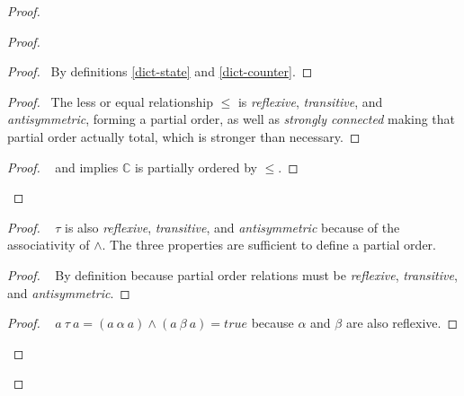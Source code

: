 \documentclass[10pt, oneside]{article}   	%
\begin{document}
\begin{proof}
\begin{proof}
			\begin{proof}
				\pf~By definitions \ref{dict-state} and \ref{dict-counter}.
			\end{proof}
			
			\begin{proof}
				\pf~The less or equal relationship $\leq$ is \textit{reflexive}, \textit{transitive}, and \textit{antisymmetric}, forming a partial order, as well as \textit{strongly connected} making that partial order actually total, which is stronger than necessary.
			\end{proof}

			\qedstep
			\begin{proof}
				\pf~ and  implies $\mathds{C}$ is partially ordered by $\leq$.
			\end{proof}
		\end{proof}
		
		\begin{proof}
			\pfsketch~ $\tau$ is also \textit{reflexive}, \textit{transitive}, and \textit{antisymmetric} because of the associativity of $\wedge$. The three properties are sufficient to define a partial order.
			\begin{proof}
				\pf~ By definition because partial order relations must be \textit{reflexive}, \textit{transitive}, and \textit{antisymmetric}.
			\end{proof}
	
			\begin{proof}
				\pf~ $a ~\tau~ a = (a ~\alpha~ a) \wedge (a ~\beta~ a) = true$ because  $\alpha$ and $\beta$ are also reflexive.
			\end{proof}
			

\end{proof}
\end{proof}
\end{document}
